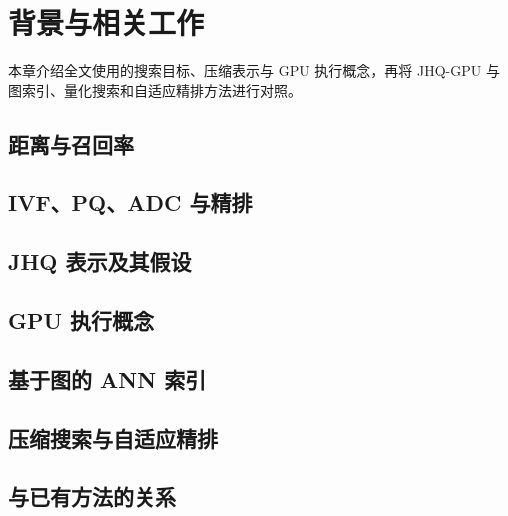 \chapter{背景与相关工作}
\label{ch:background}

本章介绍全文使用的搜索目标、压缩表示与 GPU 执行概念，再将 JHQ-GPU 与图索引、量化搜索和自适应精排方法进行对照。

\section{距离与召回率}
\label{sec:2-1}


\section{IVF、PQ、ADC 与精排}
\label{sec:2-2}


\section{JHQ 表示及其假设}
\label{sec:2-3}


\section{GPU 执行概念}
\label{sec:2-4}


\section{基于图的 ANN 索引}
\label{sec:2-5}


\section{压缩搜索与自适应精排}
\label{sec:2-6}


\section{与已有方法的关系}
\label{sec:2-7}

